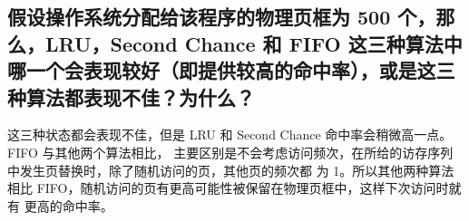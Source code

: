 
\begin{parts}
    \part {
        假设操作系统分配给该程序的物理页框为 500 个，那么，LRU，Second Chance 和 FIFO
        这三种算法中哪一个会表现较好（即提供较高的命中率），或是这三种算法都表现不佳？为什么？
    }
\end{parts}

\begin{solution}

这三种状态都会表现不佳，但是 LRU 和 Second Chance 命中率会稍微高一点。FIFO 与其他两个算法相比，
主要区别是不会考虑访问频次，在所给的访存序列中发生页替换时，除了随机访问的页，其他页的频次都
为 1。所以其他两种算法相比 FIFO，随机访问的页有更高可能性被保留在物理页框中，这样下次访问时就有
更高的命中率。


\end{solution}
